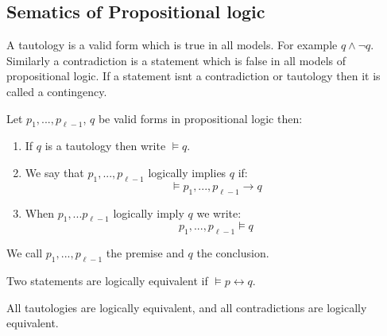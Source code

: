 \subsection{Sematics of Propositional logic}
\begin{definition}
  A tautology is a valid form which is true in all models. For example $q\land \lnot q$. Similarly a contradiction is a statement which is false in all models of propositional logic. If a statement isnt a contradiction or tautology then it is called a contingency.
\end{definition}
\begin{definition}
  Let $p_1,...,p_{\ell -1}$, $q$ be valid forms in propositional logic then:
  \begin{enumerate}
    \item If $q$ is a tautology then write $\vDash q$. 
    \item We say that $p_1,...,p_{\ell-1}$ logically implies $q$ if:
      $$\vDash p_1,...,p_{\ell-1} \to q$$
    \item When $p_1,...p_{\ell -1}$ logically imply $q$ we write:
      \[p_1,...,p_{\ell-1} \vDash q\]
  \end{enumerate}
  We call $p_1,...,p_{\ell -1}$ the premise and $q$ the conclusion.
\end{definition}
\begin{definition}
  Two statements are logically equivalent if $\vDash p \leftrightarrow q$.
\end{definition}
\begin{proposition}
  All tautologies are logically equivalent, and all contradictions are logically equivalent.
\end{proposition}
